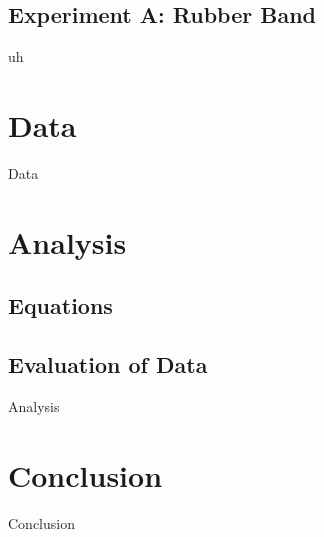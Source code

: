 \documentclass[12pt]{article}
\begin{document}
        \subsection{Experiment A: Rubber Band}
            uh
    \section{Data}
        Data
    \section{Analysis}
        \subsection{Equations}
        \subsection{Evaluation of Data}
        Analysis 
    \section{Conclusion}
        Conclusion
\end{document}
